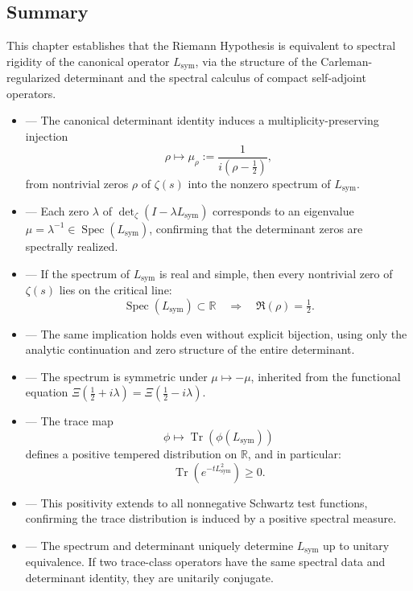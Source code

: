 \subsection*{Summary}

This chapter establishes that the Riemann Hypothesis is equivalent to spectral rigidity of the canonical operator \( L_{\mathrm{sym}} \), via the structure of the Carleman-regularized determinant and the spectral calculus of compact self-adjoint operators.

\begin{itemize}
  \item {} — The canonical determinant identity induces a multiplicity-preserving injection
  \[
  \rho \mapsto \mu_\rho := \frac{1}{i(\rho - \tfrac{1}{2})},
  \]
  from nontrivial zeros \( \rho \) of \( \zeta(s) \) into the nonzero spectrum of \( L_{\mathrm{sym}} \).

  \item {} — Each zero \( \lambda \) of \( \det\nolimits_\zeta(I - \lambda L_{\mathrm{sym}}) \) corresponds to an eigenvalue \( \mu = \lambda^{-1} \in \operatorname{Spec}(L_{\mathrm{sym}}) \), confirming that the determinant zeros are spectrally realized.

  \item {} — If the spectrum of \( L_{\mathrm{sym}} \) is real and simple, then every nontrivial zero of \( \zeta(s) \) lies on the critical line:
  \[
  \operatorname{Spec}(L_{\mathrm{sym}}) \subset \mathbb{R}
  \quad \Longrightarrow \quad
  \Re(\rho) = \tfrac{1}{2}.
  \]

  \item {} — The same implication holds even without explicit bijection, using only the analytic continuation and zero structure of the entire determinant.

  \item {} — The spectrum is symmetric under \( \mu \mapsto -\mu \), inherited from the functional equation \( \Xi(\tfrac{1}{2} + i\lambda) = \Xi(\tfrac{1}{2} - i\lambda) \).

  \item {} — The trace map
  \[
  \phi \mapsto \operatorname{Tr}(\phi(L_{\mathrm{sym}}))
  \]
  defines a positive tempered distribution on \( \mathbb{R} \), and in particular:
  \[
  \operatorname{Tr}(e^{-t L_{\mathrm{sym}}^2}) \ge 0.
  \]

  \item {} — This positivity extends to all nonnegative Schwartz test functions, confirming the trace distribution is induced by a positive spectral measure.

  \item {} — The spectrum and determinant uniquely determine \( L_{\mathrm{sym}} \) up to unitary equivalence. If two trace-class operators have the same spectral data and determinant identity, they are unitarily conjugate.
\end{itemize}

